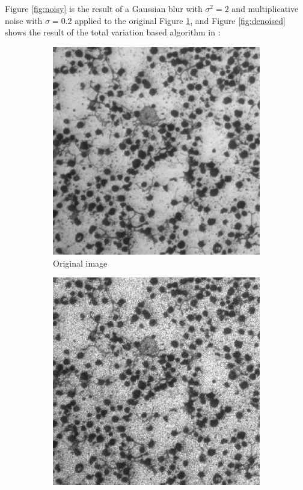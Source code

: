 \documentclass[11pt, oneside]{article}   	%
\begin{document}
Figure \ref{fig:noisy} is the result of a Gaussian blur with $\sigma^2 = 2$ and
multiplicative noise with $\sigma = 0.2$ applied to the original Figure
\ref{fig:original}, and Figure \ref{fig:denoised} shows the result of the
total variation based algorithm in \cite{rudin2003}:
\begin{figure}
    \centering
    \begin{subfigure}[b]{0.3\textwidth}
        \includegraphics[width=\textwidth]{figure/original}
        \caption{Original image}
        \label{fig:original}
    \end{subfigure}
    \begin{subfigure}[b]{0.3\textwidth}
        \includegraphics[width=\textwidth]{figure/noisy}

\end{subfigure}
\end{figure}
\end{document}
